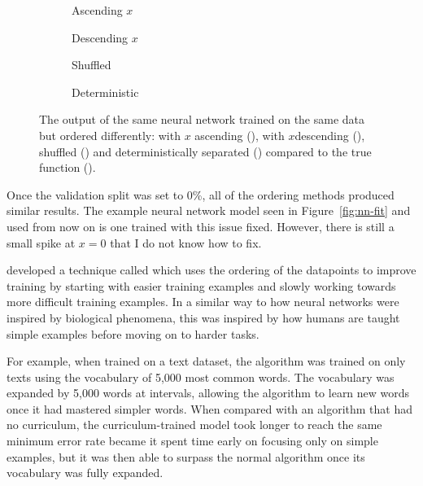 \begin{figure}[htbp]
	\vspace*{-3cm}
    \centering
    \begin{subfigure}[b]{\figwidth}
		
        \caption{Ascending \(x\)}
        \label{fig:compare-order-ascending}
	\end{subfigure}
    \begin{subfigure}[b]{\figwidth}
		
        \caption{Descending \(x\)}
        \label{fig:compare-order-descending}
	\end{subfigure}
	\begin{subfigure}[b]{\figwidth}
		
        \caption{Shuffled}
        \label{fig:compare-order-shuffled}
	\end{subfigure}
	\begin{subfigure}[b]{\figwidth}
		
        \caption{Deterministic}
        \label{fig:compare-order-deterministic}
	\end{subfigure}
	\caption{The output of the same neural network trained on the same data but ordered differently: with \(x\) ascending (\ascendingcolour), with \(x\)descending (\descendingcolour), shuffled (\shuffledcolour) and deterministically separated (\deterministiccolour) compared to the true function (\truthcolour).}
	\label{fig:compare-order}
\end{figure}

Once the validation split was set to 0\%, all of the ordering methods produced similar results.
The example neural network model seen in Figure~\ref{fig:nn-fit} and used from now on is one trained with this issue fixed.
However, there is still a small spike at \(x=0\) that I do not know how to fix. 

\textcite{bengio2009} developed a technique called  which uses the ordering of the datapoints to improve training by starting with easier training examples and slowly working towards more difficult training examples.
In a similar way to how neural networks were inspired by biological phenomena, this was inspired by how humans are taught simple examples before moving on to harder tasks.

For example, when trained on a text dataset, the algorithm was trained on only texts using the vocabulary of 5,000 most common words.
The vocabulary was expanded by 5,000 words at intervals, allowing the algorithm to learn new words once it had mastered simpler words.
When compared with an algorithm that had no curriculum, the curriculum-trained model took longer to reach the same minimum error rate became it spent time early on focusing only on simple examples, but it was then able to surpass the normal algorithm once its vocabulary was fully expanded.
